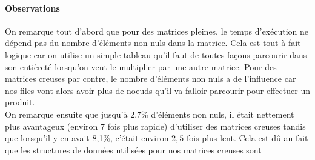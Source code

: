 \documentclass[12pt,a4paper]{article}
\begin{document}
\paragraph{Observations}

On remarque tout d'abord que pour des matrices pleines, le temps d'exécution ne dépend pas du nombre d'éléments non nuls dans la matrice. Cela est tout à fait logique car on utilise un simple tableau qu'il faut de toutes façons parcourir dans son entièreté lorsqu'on veut le multiplier par une autre matrice. Pour des matrices creuses par contre, le nombre d'éléments non nuls a de l'influence car nos files vont alors avoir plus de noeuds qu'il va falloir parcourir pour effectuer un produit.\\

On remarque ensuite que jusqu'à 2,7\% d'éléments non nuls, il était nettement plus avantageux (environ $7$ fois plus rapide) d'utiliser des matrices creuses tandis que lorsqu'il y en avait 8,1\%, c'était environ $2,5$ fois plus lent. Cela est dû au fait que les structures de données utilisées pour nos matrices creuses sont 

%
\end{document}
